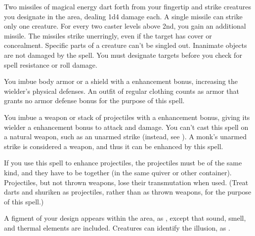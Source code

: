 \spelleffect Two missiles of magical energy dart forth from your fingertip and strike creatures you designate in the area, dealing 1d4 damage each. A single missile can strike only one creature. For every two caster levels above 2nd, you gain an additional missile.
The missiles strike unerringly, even if the target has cover or concealment. Specific parts of a creature can't be singled out. Inanimate objects are not damaged by the spell. You must designate targets before you check for spell resistance or roll damage.

\spelldur{\durmed}
\spelleffect You imbue body armor or a shield with a  enhancement bonus, increasing the wielder's physical defenses. \spellbonusscalingdescription
\spellnotes An outfit of regular clothing counts as armor that grants no armor defense bonus for the purpose of this spell.

\spelldur{\durshort}
\spelleffect You imbue a weapon or stack of projectiles with a  enhancement bonus, giving its wielder a  enhancement bonus to attack and damage. \spellbonusscalingdescription
\spellnotes You can't cast this spell on a natural weapon, such as an unarmed strike (instead, see ). A monk's unarmed strike is considered a weapon, and thus it can be enhanced by this spell.
\par If you use this spell to enhance projectiles, the projectiles must be of the same kind, and they have to be together (in the same quiver or other container). Projectiles, but not thrown weapons, lose their transmutation when used. (Treat darts and shuriken as projectiles, rather than as thrown weapons, for the purpose of this spell.)

\spelldur{\durshort}
\spellline
\spelleffect A figment of your design appears within the area, as , except that sound, smell, and thermal elements are included.
\spellnotes Creatures can identify the illusion, as .

